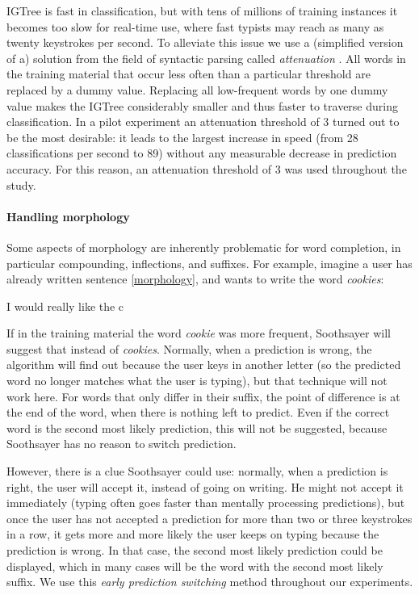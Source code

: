 \documentclass[12pt]{article}
\begin{document}
IGTree is fast in classification, but with tens of millions of training instances it becomes too slow for real-time use, where fast typists may reach as many as twenty keystrokes per second. To alleviate this issue we  use a (simplified version of a) solution from the field of syntactic parsing called \emph{attenuation} \cite{eisner96}. All words in the training material that occur less often than a particular threshold are replaced by a dummy value. Replacing all low-frequent words by one dummy value makes the IGTree considerably smaller and thus faster to traverse during classification. In a pilot experiment an attenuation threshold of 3 turned out to be the most desirable: it leads to the largest increase in speed (from 28 classifications per second to 89) without any measurable decrease in prediction accuracy. For this reason, an attenuation threshold of 3 was used throughout the study.

\paragraph{Handling morphology} \label{early}

Some aspects of morphology are inherently problematic for word completion, in particular compounding, inflections, and suffixes. For example, imagine a user has already written sentence \ref{morphology}, and wants to write the word \emph{cookies}:

\begin{examples}
\item I would really like the c \label{morphology}
\end{examples}

If in the training material the word \emph{cookie} was more frequent, Soothsayer will suggest that instead of \emph{cookies}. Normally, when a prediction is wrong, the algorithm will find out because the user keys in another letter (so the predicted word no longer matches what the user is typing), but that technique will not work here. For words that only differ in their suffix, the point of difference is at the end of the word, when there is nothing left to predict. Even if the correct word is the second most likely prediction, this will not be suggested, because Soothsayer has no reason to switch prediction.

However, there is a clue Soothsayer could use: normally, when a prediction is right, the user will accept it, instead of going on writing. He might not accept it immediately (typing often goes faster than mentally processing predictions), but once the user has not accepted a prediction for more than two or three keystrokes in a row, it gets more and more likely the user keeps on typing because the prediction is wrong. In that case, the second most likely prediction could be displayed, which in many cases will be the word with the second most likely suffix. We use this \emph{early prediction switching} method throughout our experiments.
\end{document}
